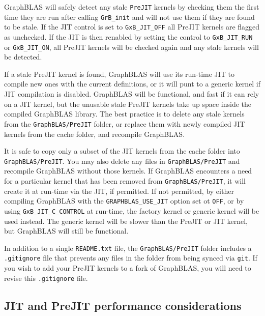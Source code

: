 \documentclass[12pt]{article}
\begin{document}
GraphBLAS will safely detect any stale \verb'PreJIT' kernels by checking them
the first time they are run after calling \verb'GrB_init' and will not use them
if they are found to be stale.  If the JIT control is set to \verb'GxB_JIT_OFF'
all PreJIT kernels are flagged as unchecked.  If the JIT is then renabled by
setting the control to \verb'GxB_JIT_RUN' or \verb'GxB_JIT_ON', all PreJIT
kernels will be checked again and any stale kernels will be detected.

If a stale PreJIT kernel is found, GraphBLAS will use its run-time JIT to
compile new ones with the current definitions, or it will punt to a generic
kernel if JIT compilation is disabled.  GraphBLAS will be functional, and fast
if it can rely on a JIT kernel, but the unusable stale PreJIT kernels take up
space inside the compiled GraphBLAS library.  The best practice is to delete
any stale kernels from the \verb'GraphBLAS/PreJIT' folder, or replace them with
newly compiled JIT kernels from the cache folder, and recompile GraphBLAS.

It is safe to copy only a subset of the JIT kernels from the cache folder into
\verb'GraphBLAS/PreJIT'.  You may also delete any files in
\verb'GraphBLAS/PreJIT' and recompile GraphBLAS without those kernels.  If
GraphBLAS encounters a need for a particular kernel that has been removed from
\verb'GraphBLAS/PreJIT', it will create it at run-time via the JIT, if
permitted.  If not permitted, by either compiling GraphBLAS with the
\verb'GRAPHBLAS_USE_JIT' option set ot \verb'OFF', or by using
\verb'GxB_JIT_C_CONTROL' at run-time, the factory kernel or generic kernel will
be used instead.  The generic kernel will be slower than the PreJIT or JIT
kernel, but GraphBLAS will still be functional.

In addition to a single \verb'README.txt' file, the \verb'GraphBLAS/PreJIT'
folder includes a \verb'.gitignore' file that prevents any files in the folder
from being synced via \verb'git'.  If you wish to add your PreJIT kernels to a
fork of GraphBLAS, you will need to revise this \verb'.gitignore' file.

\subsection{{\sf JIT} and {\sf PreJIT} performance considerations}
\label{jit_performance}
\end{document}
